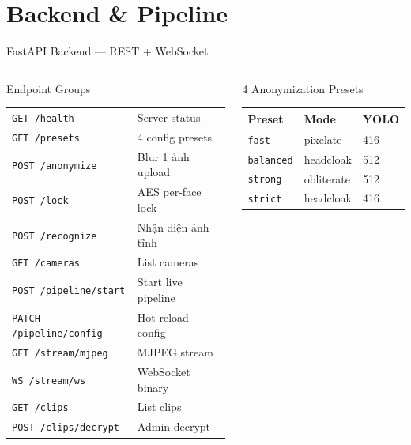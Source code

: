 \documentclass[aspectratio=169, 12pt]{beamer}
\begin{document}

\section{Backend \& Pipeline}

\begin{frame}{FastAPI Backend --- REST + WebSocket}
\begin{columns}[T]
\begin{block}{Endpoint Groups}
\footnotesize
\renewcommand{\arraystretch}{1.3}
\begin{tabular}{ll}
\texttt{GET /health} & Server status \\
\texttt{GET /presets} & 4 config presets \\
\hline
\texttt{POST /anonymize} & Blur 1 ảnh upload \\
\texttt{POST /lock} & AES per-face lock \\
\texttt{POST /recognize} & Nhận diện ảnh tĩnh \\
\hline
\texttt{GET /cameras} & List cameras \\
\texttt{POST /pipeline/start} & Start live pipeline \\
\texttt{PATCH /pipeline/config} & Hot-reload config \\
\hline
\texttt{GET /stream/mjpeg} & MJPEG stream \\
\texttt{WS /stream/ws} & WebSocket binary \\
\hline
\texttt{GET /clips} & List clips \\
\texttt{POST /clips/decrypt} & Admin decrypt \\
\end{tabular}
\end{block}

\begin{block}{4 Anonymization Presets}
\renewcommand{\arraystretch}{1.4}
\footnotesize
\begin{tabular}{lll}
\textbf{Preset} & \textbf{Mode} & \textbf{YOLO} \\
\hline
\texttt{fast} & pixelate & 416 \\
\texttt{balanced} & headcloak & 512 \\
\texttt{strong} & obliterate & 512 \\
\texttt{strict} & headcloak & 416 \\
\end{tabular}
\end{block}


\end{columns}
\end{frame}
\end{document}
